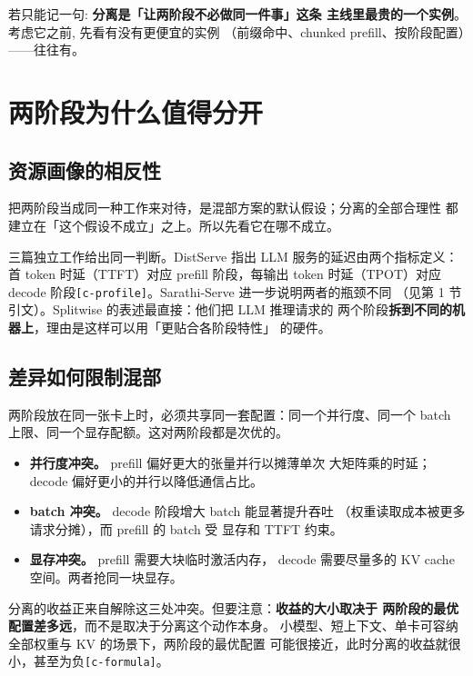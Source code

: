 \noindent 若只能记一句: \textbf{分离是「让两阶段不必做同一件事」这条
主线里最贵的一个实例}。考虑它之前, 先看有没有更便宜的实例
（前缀命中、chunked prefill、按阶段配置）——往往有。

\section{两阶段为什么值得分开}
\label{sec:why}

\subsection{资源画像的相反性}

把两阶段当成同一种工作来对待，是混部方案的默认假设；分离的全部合理性
都建立在「这个假设不成立」之上。所以先看它在哪不成立。

三篇独立工作给出同一判断。DistServe 指出 LLM 服务的延迟由两个指标定义：
首 token 时延（TTFT）对应 prefill 阶段，每输出 token 时延（TPOT）对应
decode 阶段\texttt{[c-profile]}。Sarathi-Serve 进一步说明两者的瓶颈不同
（见第 1 节引文）。Splitwise 的表述最直接：他们把 LLM 推理请求的
两个阶段\textbf{拆到不同的机器上}，理由是这样可以用「更贴合各阶段特性」
的硬件。

\subsection{差异如何限制混部}

两阶段放在同一张卡上时，必须共享同一套配置：同一个并行度、同一个
batch 上限、同一个显存配额。这对两阶段都是次优的。

\begin{itemize}[leftmargin=1.3em,itemsep=1.5pt,topsep=2pt]
  \item \textbf{并行度冲突。} prefill 偏好更大的张量并行以摊薄单次
        大矩阵乘的时延；decode 偏好更小的并行以降低通信占比。
  \item \textbf{batch 冲突。} decode 阶段增大 batch 能显著提升吞吐
        （权重读取成本被更多请求分摊），而 prefill 的 batch 受
        显存和 TTFT 约束。
  \item \textbf{显存冲突。} prefill 需要大块临时激活内存，
        decode 需要尽量多的 KV cache 空间。两者抢同一块显存。
\end{itemize}

分离的收益正来自解除这三处冲突。但要注意：\textbf{收益的大小取决于
两阶段的最优配置差多远}，而不是取决于分离这个动作本身。
小模型、短上下文、单卡可容纳全部权重与 KV 的场景下，两阶段的最优配置
可能很接近，此时分离的收益就很小，甚至为负\texttt{[c-formula]}。

